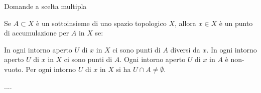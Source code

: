 \documentclass[a4paper]{article}
\begin{document}


\begin{esercizi*}{Domande a scelta multipla}

\begin{exerm}
Se $A\subset X$ è un sottoinsieme di uno spazio topologico $X$,
allora $x\in X$ è un punto di accumulazione per
$A$ in $X$ se:
\begin{rispm}[1] 
\risp[=] 
In ogni intorno aperto $U$ di $x$ in $X$ ci sono
punti di $A$ diversi da $x$.
\risp In ogni intorno aperto $U$ di $x$ in $X$ ci sono punti di $A$.
\risp Ogni intorno aperto $U$ di $x$ in $A$ è non-vuoto.
\risp Per ogni intorno $U$ di $x$ in $X$ si ha $U\cap A \neq \emptyset$.
\end{rispm}
\end{exerm}

....

\end{esercizi*}
\end{document}
